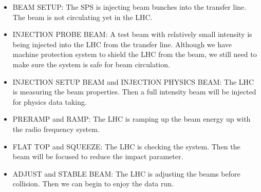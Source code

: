 \begin{itemize}
\item BEAM SETUP: The SPS is injecting beam bunches into the transfer line. The beam is not circulating yet in the LHC.
\item INJECTION PROBE BEAM: A test beam with relatively small intensity is being injected into the LHC from the transfer line. Although we have machine protection system to shield the LHC from the beam, we still need to make sure the system is safe for beam circulation.
\item INJECTION SETUP BEAM and INJECTION PHYSICS BEAM: The LHC is measuring the beam properties. Then a full intensity beam will be injected for physics data taking.
\item PRERAMP and RAMP: The LHC is ramping up the beam energy up with the radio frequency system.
\item FLAT TOP and SQUEEZE: The LHC is checking the system. Then the beam will be focused to reduce the impact parameter.
\item ADJUST and STABLE BEAM: The LHC is adjusting the beams before collision. Then we can begin to enjoy the data run.
\end{itemize}

